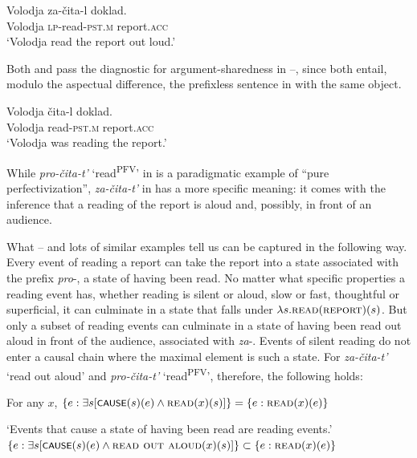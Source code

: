 \documentclass[output=paper,colorlinks,citecolor=brown]{langscibook}
\begin{document}
\ea\label{ex:tatevosov:98}
\gll Volodja   za-čita-l   doklad.\\
  Volodja  \textsc{lp}-read-\textsc{pst.m}  report.\textsc{acc}\\
\glt ‘Volodja read the report out loud.’
\z

\noindent Both  and  pass the diagnostic for argument-sharedness in --, since both entail, modulo the aspectual difference, the prefixless sentence in  with the same object.

\ea\label{ex:tatevosov:99}
\gll Volodja   čita-l   doklad.\\
  Volodja  read-\textsc{pst.m}  report.\textsc{acc}\\
\glt ‘Volodja was reading the report.’
\z

\noindent While \textit{pro-čita-t’} ‘read\textsuperscript{PFV}’ in  is a paradigmatic example of “pure perfectivization”, \textit{za-čita-t’}  in  has a more specific meaning: it comes with the inference that a reading of the report is aloud and, possibly, in front of an audience.

What -- and lots of similar examples tell us can be captured in the following way. Every event of reading a report can take the report into a state associated with the prefix \textit{pro}-, a state of having been read. No matter what specific properties a reading event has, whether reading is silent or aloud, slow or fast, thoughtful or superficial, it can culminate in a state that falls under $\lambda s.\textsc{read}(\textsc{report})(s)$. But only a subset of reading events can culminate in a state of having been read out aloud in front of the audience, associated with \textit{za}-. Events of silent reading do not enter a causal chain where the maximal element is such a state. For \textit{za-čita-t’} ‘read out aloud’ and  \textit{pro-čita-t’} ‘read\textsuperscript{PFV}’, therefore, the following holds:

\ea   For any $x$,\label{ex:tatevosov:100}
\ea
$\{e: \exists s [\cnst{cause}(s)(e) \wedge \textsc{read}(x)(s) ] \} = \{e: \textsc{read}(x)(e) \}$

\glt    ‘Events that cause a state of having been read are reading events.’\label{ex:tatevosov:100a}
\ex     $\{e: \exists s [ \cnst{cause}(s)(e) \wedge \textsc{read out aloud}(x)(s)]\} \subset \{e:  \textsc{read}(x)(e)\}$
\end{document}
